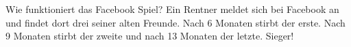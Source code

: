 Wie funktioniert das Facebook Spiel?
Ein Rentner meldet sich bei Facebook an und findet dort drei seiner alten Freunde.
Nach 6 Monaten stirbt der erste.
Nach 9 Monaten stirbt der zweite und nach 13 Monaten der letzte.
Sieger!




